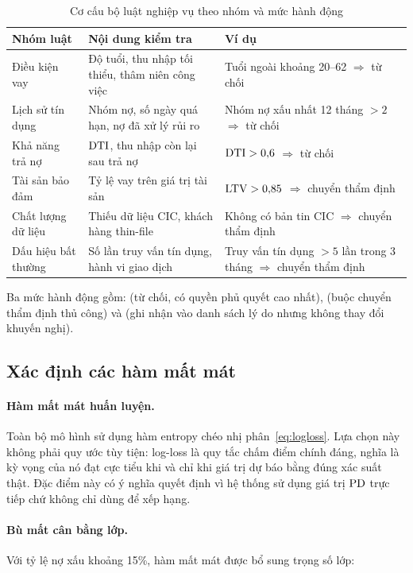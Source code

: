 \begin{table}[htbp]
\centering
\caption{Cơ cấu bộ luật nghiệp vụ theo nhóm và mức hành động}
\label{tab:rule-groups}
\small
\begin{tabular}{@{}L{3.2cm}L{4.2cm}L{5.0cm}@{}}
\toprule
\textbf{Nhóm luật} & \textbf{Nội dung kiểm tra} & \textbf{Ví dụ} \\
\midrule
Điều kiện vay & Độ tuổi, thu nhập tối thiểu, thâm niên công việc &
Tuổi ngoài khoảng 20--62 $\Rightarrow$ từ chối \\
Lịch sử tín dụng & Nhóm nợ, số ngày quá hạn, nợ đã xử lý rủi ro &
Nhóm nợ xấu nhất 12 tháng $> 2$ $\Rightarrow$ từ chối \\
Khả năng trả nợ & $\mathrm{DTI}$, thu nhập còn lại sau trả nợ &
$\mathrm{DTI} > 0{,}6$ $\Rightarrow$ từ chối \\
Tài sản bảo đảm & Tỷ lệ vay trên giá trị tài sản &
$\mathrm{LTV} > 0{,}85$ $\Rightarrow$ chuyển thẩm định \\
Chất lượng dữ liệu & Thiếu dữ liệu CIC, khách hàng thin-file &
Không có bản tin CIC $\Rightarrow$ chuyển thẩm định \\
Dấu hiệu bất thường & Số lần truy vấn tín dụng, hành vi giao dịch &
Truy vấn tín dụng $> 5$ lần trong 3 tháng $\Rightarrow$ chuyển thẩm định \\
\bottomrule
\end{tabular}
\end{table}

Ba mức hành động gồm:  (từ chối, có quyền phủ quyết cao nhất),
 (buộc chuyển thẩm định thủ công) và  (ghi nhận vào
danh sách lý do nhưng không thay đổi khuyến nghị).

\subsection{Xác định các hàm mất mát}
\label{subsec:ham-mat-mat}

\paragraph{Hàm mất mát huấn luyện.} Toàn bộ mô hình sử dụng hàm entropy chéo nhị
phân~\eqref{eq:logloss}. Lựa chọn này không phải quy ước tùy tiện: log-loss là
quy tắc chấm điểm chính đáng, nghĩa là kỳ vọng của nó đạt cực tiểu khi và chỉ khi
giá trị dự báo bằng đúng xác suất thật. Đặc điểm này có ý nghĩa quyết định vì hệ
thống sử dụng giá trị $\mathrm{PD}$ trực tiếp chứ không chỉ dùng để xếp hạng.

\paragraph{Bù mất cân bằng lớp.} Với tỷ lệ nợ xấu khoảng 15\%, hàm mất mát được
bổ sung trọng số lớp:

